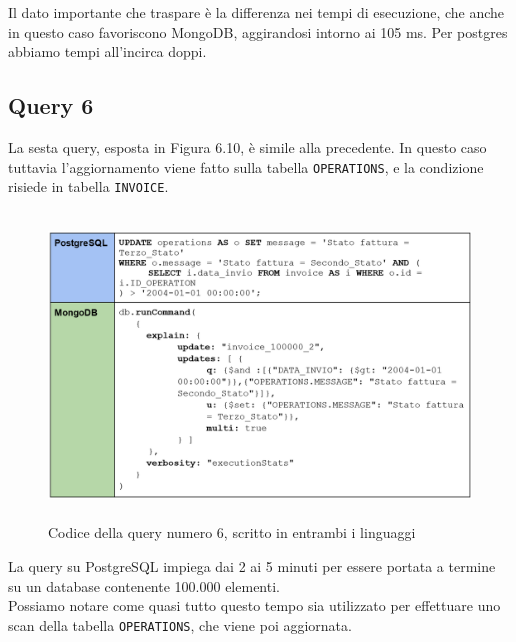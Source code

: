 \noindent Il dato importante che traspare è la differenza nei tempi di esecuzione, che anche in questo caso favoriscono MongoDB, aggirandosi intorno ai 105 ms. Per postgres abbiamo tempi all'incirca doppi.\\


\subsection{Query 6}
La sesta query, esposta in Figura 6.10, è simile alla precedente. In questo caso tuttavia l'aggiornamento viene fatto sulla tabella \texttt{OPERATIONS}, e la condizione risiede in tabella \texttt{INVOICE}.\\

\begin{figure}[htbp]
\begin{center}
\includegraphics[height=22em]{immagini/query/query6.png}
\caption{Codice della query numero 6, scritto in entrambi i linguaggi}
\end{center}
\end{figure}

\noindent La query su PostgreSQL impiega dai 2 ai 5 minuti per essere portata a termine su un database contenente 100.000 elementi.\\
Possiamo notare come quasi tutto questo tempo sia utilizzato per effettuare uno scan della tabella \texttt{OPERATIONS}, che viene poi aggiornata.\\

